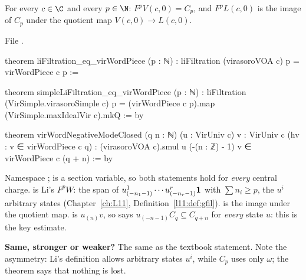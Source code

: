 \begin{theorem}\label{l20:thm:virli}
For every $c\in\C$ and every $p\in\N$: $F^pV(c,0)=C_p$, and $F^pL(c,0)$ is the image of $C_p$ under the quotient map
$V(c,0)\to L(c,0)$.
\end{theorem}
\noindent File .
\begin{leancode}
theorem liFiltration_eq_virWordPiece (p : ℕ) :
    liFiltration (virasoroVOA c) p = virWordPiece c p :=

theorem simpleLiFiltration_eq_virWordPiece (p : ℕ) :
    liFiltration (VirSimple.virasoroSimple c) p =
      (virWordPiece c p).map (VirSimple.maxIdealVir c).mkQ := by

theorem virWordNegativeModeClosed (q n : ℕ) (u : VirUniv c) {v : VirUniv c}
    (hv : v ∈ virWordPiece c q) :
    (virasoroVOA c).smul u (-(n : ℤ) - 1) v ∈ virWordPiece c (q + n) := by
\end{leancode}

\begin{dictionary}
Namespace ;  is a section variable, so both statements hold for \emph{every} central
charge.  is Li's $F^pW$: the span of $u^1_{(-n_1-1)}\cdots u^r_{(-n_r-1)}\mathbf{1}$ with
$\sum n_i\ge p$, the $u^i$ arbitrary states (Chapter~\ref{ch:L11}, Definition~\ref{l11:def:gfil}).  is
the image under the quotient map.  is $u_{(n)}v$, so  says
$u_{(-n-1)}C_q\subseteq C_{q+n}$ for \emph{every} state $u$: this is the key estimate.

\textbf{Same, stronger or weaker?} The same as the textbook statement. Note the asymmetry: Li's definition allows
arbitrary states $u^i$, while $C_p$ uses only $\omega$; the theorem says that nothing is lost.
\end{dictionary}

